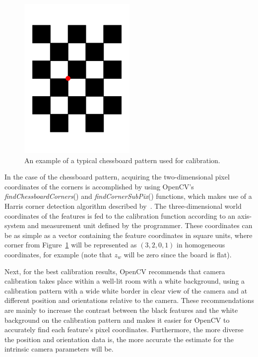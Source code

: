 \begin{figure}
  \centering
  \includegraphics[angle=90, width=0.5\textwidth]{figures/chapter2/chessboard_pattern}
  \caption{An example of a typical chessboard pattern used for calibration.}
\label{fig:chap2-calib-pattern}
\end{figure}

In the case of the chessboard pattern, acquiring the two-dimensional pixel coordinates of the corners is accomplished by using OpenCV's \emph{findChessboardCorners}() and \emph{findCornerSubPix}() functions, which makes use of a Harris corner detection algorithm described by~\cite{harris1988combined}. The three-dimensional world coordinates of the features is fed to the calibration function according to an axis-system and measurement unit defined by the programmer. These coordinates can be as simple as a vector containing the feature coordinates in square units, where corner from Figure~\ref{fig:chap2-calib-pattern} will be represented as $(3, 2, 0, 1)$ in homogeneous coordinates, for example (note that $z_w$ will be zero since the board is flat). 

Next, for the best calibration results, OpenCV recommends that camera calibration takes place within a well-lit room with a white background, using a calibration pattern with a wide white border in clear view of the camera and at different position and orientations relative to the camera. These recommendations are mainly to increase the contrast between the black features and the white background on the calibration pattern and makes it easier for OpenCV to accurately find each feature's pixel coordinates. Furthermore, the more diverse the position and orientation data is, the more accurate the estimate for the intrinsic camera parameters will be. 


